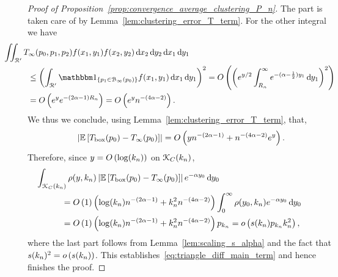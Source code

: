 \begin{proof}[Proof of Proposition~\ref{prop:convergence_average_clustering_P_n}]
The part is taken care of by Lemma~\ref{lem:clustering_error_T_term}. For the other integral we have
\begin{align*}
	&\hspace{-30pt}\iint_{\Rcal^\prime} T_{\infty}(p_0,p_1,p_2) f(x_1,y_1) f(x_2,y_2)
		\dd x_2 \dd y_2 \dd x_1 \dd y_1\\
	&\le \left(\int_{\Rcal^\prime} \ind{p_1 \in \BallPo{p_0}} f(x_1,y_1) \dd x_1 \dd y_1\right)^2
		= \bigO{\left(e^{y/2} \int_{R_n}^\infty e^{-(\alpha - \frac{1}{2})y_1} \dd y_1\right)^2}\\
	&= \bigO{e^{y} e^{-(2\alpha-1)R_n}} = \bigO{e^y n^{-(4\alpha - 2)}}.
\end{align*}
We thus we conclude, using Lemma~\ref{lem:clustering_error_T_term}, that,
\begin{equation}\label{eq:triangle_count_diff_scaling}
	\left|\mathbb{E}\left[T_{\text{box}}(p_0) - T_{\infty}(p_0)\right]\right| = O\left(y n^{-(2\alpha - 1)} + n^{-(4\alpha-2)} e^{y}\right).
\end{equation}
Therefore, since $y = O\left(\log(k_n)\right)$ on ${\mathcal K}_C(k_n)$, 
\begin{align*}
	&\hspace{-30pt}\int_{\Kcal_{C}(k_n)} \rho(y,k_n) \left|\Exp{T_{\text{box}}(p_0) - T_{\infty}(p_0)}\right| 
		e^{-\alpha y_0} \dd y_0\\
	&= \bigO{1} \left(\log(k_n) n^{-(2\alpha - 1)} + k_n^2 n^{-(4\alpha - 2)} \right) 
		\int_{0}^\infty \rho(y_0,k_n) e^{-\alpha y_0} \dd y_0\\
	&= \bigO{1} \left(\log(k_n) n^{-(2\alpha - 1)} + k_n^2 n^{-(4\alpha - 2)} \right) p_{k_n} = \smallO{s(k_n) p_{k_n} k_n^2},
\end{align*}
where the last part follows from Lemma~\ref{lem:scaling_s_alpha} and the fact that $s(k_n)^2 = o\left(s(k_n)\right)$. This establishes~\eqref{eq:triangle_diff_main_term} and hence finishes the proof.
%
\end{proof}

